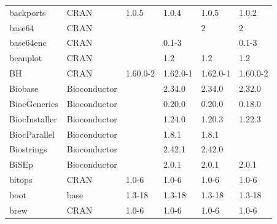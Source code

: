 \begin{longtable}{llllll}
backports                     & \acrshort{CRAN}                      & 1.0.5       & 1.0.4       & 1.0.5          & 1.0.2             \\
\rowcolor{black!5}
base64                        & \acrshort{CRAN}                      &             &             & 2              & 2                  \\
\rowcolor{black!10}
base64enc                     & \acrshort{CRAN}                      &             & 0.1-3       &                & 0.1-3             \\
\rowcolor{black!5}
beanplot                      & \acrshort{CRAN}                      &             & 1.2         & 1.2            & 1.2                \\
\rowcolor{black!10}
BH                            & \acrshort{CRAN}                      & 1.60.0-2    & 1.62.0-1    & 1.62.0-1       & 1.60.0-2          \\
\rowcolor{black!5}
Biobase                       & Bioconductor              &             & 2.34.0      & 2.34.0         & 2.32.0             \\
\rowcolor{black!10}
BiocGenerics                  & Bioconductor              &             & 0.20.0      & 0.20.0         & 0.18.0            \\
\rowcolor{black!5}
BiocInstaller                 & Bioconductor              &             & 1.24.0      & 1.20.3         & 1.22.3             \\
\rowcolor{black!10}
BiocParallel                  & Bioconductor              &             & 1.8.1       & 1.8.1          &                   \\
\rowcolor{black!5}
Biostrings                    & Bioconductor              &             & 2.42.1      & 2.42.0         &                    \\
\rowcolor{black!10}
BiSEp                         & Bioconductor              &             & 2.0.1       & 2.0.1          & 2.0.1             \\
\rowcolor{black!5}
bitops                        & \acrshort{CRAN}                      & 1.0-6       & 1.0-6       & 1.0-6          & 1.0-6              \\
\rowcolor{black!10}
boot                          & base                      & 1.3-18      & 1.3-18      & 1.3-18         & 1.3-18            \\
\rowcolor{black!5}
brew                          & \acrshort{CRAN}                      & 1.0-6       & 1.0-6       & 1.0-6          & 1.0-6              \\

\end{longtable}
